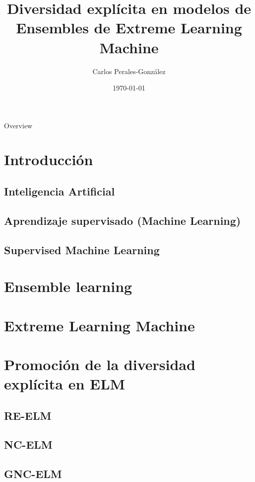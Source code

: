 \documentclass{beamer}
\title[Short title]{Diversidad explícita en modelos de Ensembles de Extreme Learning Machine}
\author[Author]
{   %
    Carlos Perales-Gonz\'alez\inst{1}
}
\institute[ULOYOLA]
{   %
    \begin{tabular}{c}
    \inst{1}Universidad Loyola Andaluc\'ia
    \end{tabular}
}
\date
{   %
	\today
}
\begin{document}
\frame{\titlepage}

\begin{frame}{Overview}
\tableofcontents
\end{frame}


\section{Introducción} %
\subsection{Inteligencia Artificial}
\subsection{Aprendizaje supervisado (Machine Learning)}
\subsection{Supervised Machine Learning}

\section{Ensemble learning} %

\section{Extreme Learning Machine}  %


\section{Promoción de la diversidad explícita en ELM}  %
\subsection{RE-ELM}
\subsection{NC-ELM}
\subsection{GNC-ELM}
\end{document}
